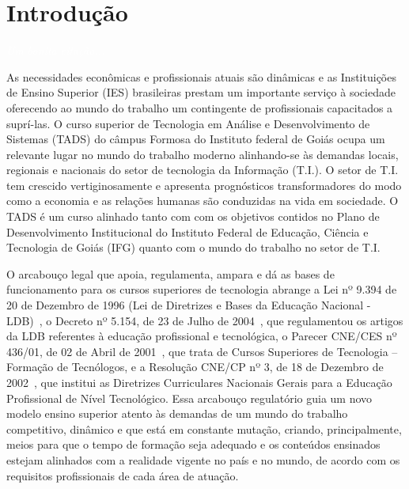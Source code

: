 \documentclass[11pt,fleqn]{book} %
\begin{document}
\chapter{Introdução}\label{introducao}
\vspace{6em}
\begin{flushright}
	\textit{\textcolor{white}{Um bonita citação...}}
\end{flushright}
\vspace{12em}

As necessidades econômicas e profissionais atuais são dinâmicas e as Instituições de Ensino Superior (IES) brasileiras prestam um importante serviço à sociedade oferecendo ao mundo do trabalho um contingente de profissionais capacitados a suprí-las. 
O curso superior de Tecnologia em Análise e Desenvolvimento de Sistemas (TADS) do câmpus Formosa do Instituto federal de Goiás ocupa um relevante lugar no mundo do trabalho moderno alinhando-se às demandas locais, regionais e nacionais do setor de tecnologia da Informação (T.I.).
O setor de T.I. tem crescido vertiginosamente e apresenta prognósticos transformadores do modo como a economia e as relações humanas são conduzidas na vida em sociedade.
O TADS é um curso alinhado tanto com com os objetivos contidos no Plano de Desenvolvimento Institucional do Instituto Federal de Educação, Ciência e Tecnologia de Goiás (IFG) quanto com o mundo do trabalho no setor de T.I.

O arcabouço legal que apoia, regulamenta, ampara e dá as bases de funcionamento para os cursos superiores de tecnologia abrange a Lei nº 9.394 de 20 de Dezembro de 1996 (Lei de Diretrizes e Bases da Educação Nacional - LDB)~\cite{Lei19394De1996}, o Decreto nº 5.154, de 23 de Julho de 2004~\cite{Decreto5154De2004}, que regulamentou os artigos da LDB referentes à educação profissional e tecnológica, o Parecer CNE/CES nº 436/01, de 02 de Abril de 2001~\cite{ParacerCNES435De2011}, que trata de Cursos Superiores de Tecnologia – Formação de Tecnólogos, e a Resolução CNE/CP nº 3, de 18 de Dezembro de 2002~\cite{Resolucao03De2002}, que institui as Diretrizes Curriculares Nacionais Gerais para a Educação Profissional de Nível Tecnológico. 
Essa arcabouço regulatório guia um novo modelo ensino superior atento às demandas de um mundo do trabalho competitivo, dinâmico e que está em constante mutação, criando, principalmente, meios para que o tempo de formação seja adequado e os conteúdos ensinados estejam alinhados com a realidade vigente no país e no mundo, de acordo com os requisitos profissionais de cada área de atuação. 
\end{document}
